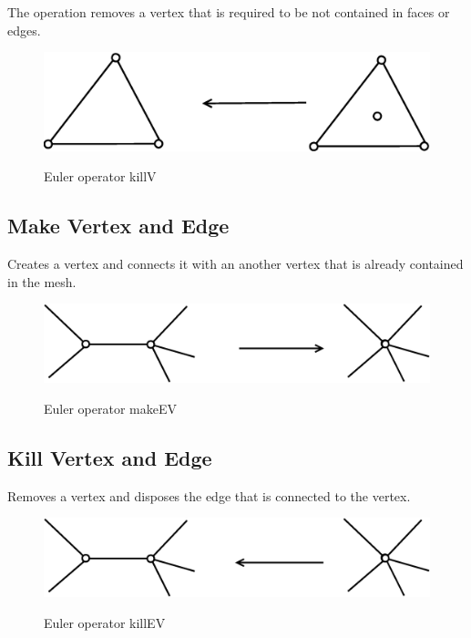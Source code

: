 The operation removes a vertex that is required to be not contained in faces or
edges.

\begin{figure}[h]
\centering
\includegraphics[scale=0.25]{../img/killV.eps}
\label{fig:killv}
\caption{Euler operator killV}
\end{figure}


\subsection{Make Vertex and Edge}

Creates a vertex and connects it with an another vertex that is already
contained in the mesh.

\begin{figure}[h]
\centering
\includegraphics[scale=0.25]{../img/makeEV.eps}
\label{fig:makeev}
\caption{Euler operator makeEV}
\end{figure}

\subsection{Kill Vertex and Edge}

Removes a vertex and disposes the edge that is connected to the vertex.

\begin{figure}[H]
\centering
\includegraphics[scale=0.25]{../img/killEV.eps}
\label{fig:killev}
\caption{Euler operator killEV}
\end{figure}

